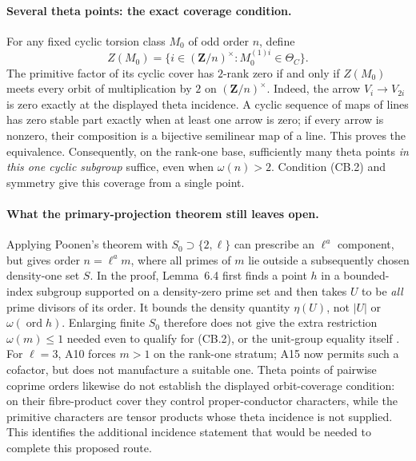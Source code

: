 \paragraph{Several theta points: the exact coverage condition.}
For any fixed cyclic torsion class $M_0$ of odd order $n$, define
\[
 Z(M_0)=\{i\in(\mathbf Z/n)^\times:
                    M_0^{(1)i}\in\Theta_C\}.
\]
The primitive factor of its cyclic cover has $2$-rank zero if and
only if $Z(M_0)$ meets every orbit of multiplication by $2$ on
$(\mathbf Z/n)^\times$. Indeed, the arrow $V_i\to V_{2i}$ is
zero exactly at the displayed theta incidence. A cyclic sequence
of maps of lines has zero stable part exactly when at least one
arrow is zero; if every arrow is nonzero, their composition is a
bijective semilinear map of a line. This proves the equivalence.
Consequently, on the rank-one base, sufficiently many theta points
\emph{in this one cyclic subgroup} suffice, even when $\omega(n)>2$.
Condition (CB.2) and symmetry give this coverage from a single point.

\paragraph{What the primary-projection theorem still leaves open.}
Applying Poonen's theorem with $S_0\supset\{2,\ell\}$ can prescribe
an $\ell^a$ component, but gives order $n=\ell^a m$, where all primes
of $m$ lie outside a subsequently chosen density-one set $S$.
In the proof, Lemma~6.4 first finds a point $h$ in a bounded-index
subgroup supported on a density-zero prime set and then takes
$U$ to be \emph{all} prime divisors of its order. It bounds the
density quantity $\eta(U)$, not $|U|$ or $\omega(\operatorname{ord}h)$.
Enlarging finite $S_0$ therefore does not give the extra restriction
$\omega(m)\le1$ needed even to qualify for (CB.2), or the unit-group
equality itself \cite[Theorem~1.8 and Lemmas~6.4--6.6]{Poonen2005}.
For $\ell=3$, A10 forces $m>1$ on the rank-one stratum; A15 now
permits such a cofactor, but does not manufacture a suitable one.
Theta points of pairwise coprime orders likewise do not establish
the displayed orbit-coverage condition: on their fibre-product
cover they control proper-conductor characters, while the primitive
characters are tensor products whose theta incidence is not supplied.
This identifies the additional incidence statement that would be
needed to complete this proposed route.
